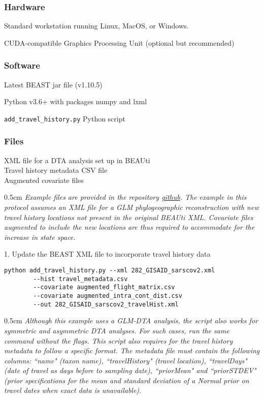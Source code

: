 \documentclass{article}
\newcommand{\ann}[1]{
\begin{adjustwidth}{0.5cm}{}
\it{#1}\\
\end{adjustwidth}}
\newcommand{\code}[1]{
{\upshape\ttfamily{#1}}}
\begin{document}
\subsubsection*{Hardware}
\hspace{0.5cm}Standard workstation running Linux, MacOS, or Windows.

\hspace{0.5cm}CUDA-compatible Graphics Processing Unit (optional but recommended)

\subsubsection*{Software}
\hspace{0.5cm}Latest BEAST jar file (v1.10.5)

\hspace{0.5cm}Python v3.6+ with packages numpy and lxml

\hspace{0.5cm}\verb|add_travel_history.py| Python script

\subsubsection*{Files}
XML file for a DTA analysis set up in BEAUti \\
Travel history metadata CSV file \\
Augmented covariate files \\

\ann{Example files are provided in the repository {\upshape\url{github}}. The example in this protocol assumes an XML file for a GLM phylogeographic reconstruction with new travel history locations not present in the original BEAUti XML. Covariate files augmented to include the new locations are thus required to accommodate for the increase in state space.}

1. Update the BEAST XML file to incorporate travel history data
\begin{verbatim}
python add_travel_history.py --xml 282_GISAID_sarscov2.xml
        --hist travel_metadata.csv
        --covariate augmented_flight_matrix.csv
        --covariate augmented_intra_cont_dist.csv
        --out 282_GISAID_sarscov2_travelHist.xml
\end{verbatim}

\ann{Although this example uses a GLM-DTA analysis, the\code{add\_travel\_history.py} script also works for symmetric and asymmetric DTA analyses. For such cases, run the same command without the\code{--covariate} flags. This script also requires for the travel history metadata to follow a specific format. The metadata file must contain the following columns: ``name"  (taxon name), ``travelHistory"  (travel location), ``travelDays"  (date of travel as days before to sampling date), ``priorMean"  and ``priorSTDEV"  (prior specifications for the mean and standard deviation of a Normal prior on travel dates when exact data is unavailable).}
\end{document}
